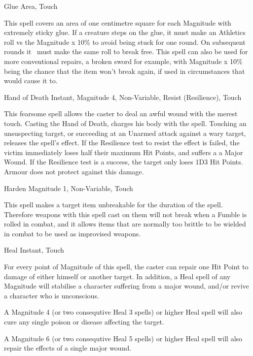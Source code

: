 \begin{rpg-spell}
{Glue}
{Area, Touch}

This spell covers an area of one centimetre square for each Magnitude with extremely sticky glue. If a creature steps on the glue, it must make an Athletics roll vs the Magnitude x 10\% to avoid being stuck for one round. On subsequent rounds it  must make the same roll to break free. This spell can also be used for more conventional repairs, a broken sword for example, with Magnitude x 10\% being the chance that the item won’t break again, if used in circumstances that would cause it to.
\end{rpg-spell}


\begin{rpg-spell}
{Hand of Death}
{Instant, Magnitude 4, Non-Variable, Resist (Resilience), Touch}

This fearsome spell allows the caster to deal an awful wound with the merest touch. Casting the Hand of Death, charges his body with the spell. Touching an unsuspecting target, or succeeding at an Unarmed attack against a wary target, releases the spell’s effect. If the Resilience test to resist the effect is failed, the victim immediately loses half their maximum Hit Points, and suffers a a Major Wound. If the Resilience test is a success, the target only loses 1D3 Hit Points. Armour does not protect against this damage.
\end{rpg-spell}


\begin{rpg-spell}
{Harden}
{Magnitude 1, Non-Variable, Touch}

This spell makes a target item unbreakable for the duration of the spell.  Therefore weapons with this spell cast on them will not break when a Fumble is rolled in combat, and it allows items that are normally too brittle to be wielded in combat to be used as improvised weapons.
\end{rpg-spell}


\begin{rpg-spell}
{Heal}
{Instant, Touch}

For every point of Magnitude of this spell, the caster can repair one Hit Point to damage of either himself or another target. In addition, a Heal spell of any Magnitude will stabilise a character suffering from a major wound, and/or revive a character who is unconscious. 

A Magnitude 4 (or two consequtive Heal 3 spells) or higher Heal spell will also cure any single poison or disease affecting the target. 

A Magnitude 6 (or two consequtive Heal 5 spells) or higher Heal spell will also repair the effects of a single major wound.
\end{rpg-spell}


